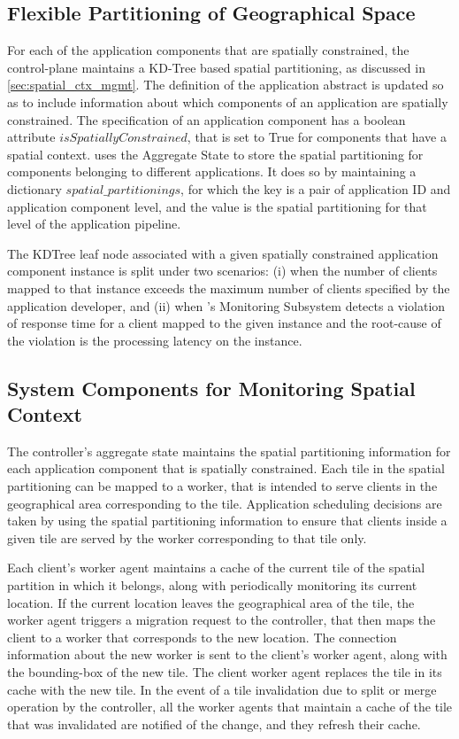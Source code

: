 \subsection{Flexible Partitioning of Geographical Space}
For each of the application components that are spatially constrained, the control-plane maintains a KD-Tree based spatial partitioning, as discussed in \cref{sec:spatial_ctx_mgmt}. The definition of the application abstract is updated so as to include information about which components of an application are spatially constrained. The specification of an application component has a boolean attribute $isSpatiallyConstrained$, that is set to True for components that have a spatial context. \oneedge{} uses the Aggregate State to store the spatial partitioning for components belonging to different applications. It does so by maintaining a dictionary $spatial\_partitionings$, for which the key is a pair of application ID and application component level, and the value is the spatial partitioning for that level of the application pipeline.
\par The KDTree leaf node associated with a given spatially constrained application component instance is split under two scenarios: (i) when the number of clients mapped to that instance exceeds the maximum number of clients specified by the application developer, and (ii) when \oneedge{}'s Monitoring Subsystem detects a violation of response time for a client mapped to the given instance and the root-cause of the violation is the processing latency on the instance.

\subsection{System Components for Monitoring Spatial Context}

The controller's aggregate state maintains the spatial partitioning information for each application component that is spatially constrained. Each tile in the spatial partitioning can be mapped to a worker, that is intended to serve clients in the geographical area corresponding to the tile. Application scheduling decisions are taken by using the spatial partitioning information to ensure that clients inside a given tile are served by the worker corresponding to that tile only. 
\par Each client's worker agent maintains a cache of the current tile of the spatial partition in which it belongs, along with periodically monitoring its current location. If the current location leaves the geographical area of the tile, the worker agent triggers a migration request to the controller, that then maps the client to a worker that corresponds to the new location. The connection information about the new worker is sent to the client's worker agent, along with the bounding-box of the new tile. The client worker agent replaces the tile in its cache with the new tile. In the event of a tile invalidation due to split or merge operation by the controller, all the worker agents that maintain a cache of the tile that was invalidated are notified of the change, and they refresh their cache.

